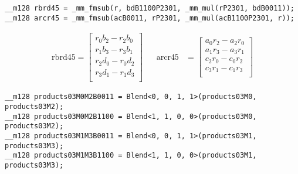 \begin{verbatim}
__m128 rbrd45 = _mm_fmsub(r, bdB1100P2301, _mm_mul(rP2301, bdB0011));
__m128 arcr45 = _mm_fmsub(acB0011, rP2301, _mm_mul(acB1100P2301, r));
\end{verbatim}

\begin{align*}
\mathrm{rbrd45} 
=
\begin{bmatrix}
r_0b_2- r_2b_0\\
r_1b_3- r_3b_1\\
r_2d_0- r_0d_2\\
r_3d_1- r_1d_3\\
\end{bmatrix}
&&
\mathrm{arcr45} 
&=
\begin{bmatrix}
a_0r_2 - a_2r_0\\
a_1r_3 - a_3r_1\\
c_2r_0 - c_0r_2\\
c_3r_1 - c_1r_3\\
\end{bmatrix}
\end{align*}

\begin{verbatim}
__m128 products03M0M2B0011 = Blend<0, 0, 1, 1>(products03M0, products03M2);
__m128 products03M0M2B1100 = Blend<1, 1, 0, 0>(products03M0, products03M2);
__m128 products03M1M3B0011 = Blend<0, 0, 1, 1>(products03M1, products03M3);
__m128 products03M1M3B1100 = Blend<1, 1, 0, 0>(products03M1, products03M3);
\end{verbatim}

